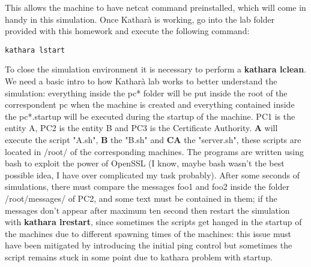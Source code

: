 \documentclass{article}
\begin{document}
This allows the machine to have netcat command preinstalled, which will come in handy in this simulation. Once Katharà is working, go into the lab folder provided with this homework and execute the following command:  

\begin{lstlisting}[breaklines]
kathara lstart
\end{lstlisting}

To close the simulation environment it is necessary to perform a \textbf{kathara lclean}. We need a basic intro to how Katharà lab works to better understand the simulation: everything inside the pc* folder will be put inside the root of the correspondent pc when the machine is created and everything contained inside the pc*.startup will be executed during the startup of the machine. PC1 is the entity A, PC2 is the entity B and PC3 is the Certificate Authority. \textbf{A} will execute the script "A.sh", \textbf{B} the "B.sh" and \textbf{CA} the "server.sh", these scripts are located in /root/ of the corresponding machines. The programs are written using bash to exploit the power of OpenSSL (I know, maybe bash wasn't the best possible idea, I have over complicated my task probably). After some seconds of simulations, there must compare the messages foo1 and foo2 inside the folder /root/messages/ of PC2, and some text must be contained in them; if the messages don't appear after maximum ten second then restart the simulation with \textbf{kathara lrestart}, since sometimes the scripts get hanged in the startup of the machines due to different spawning times of the machines: this issue must have been mitigated by introducing the initial ping control but sometimes the script remains stuck in some point due to kathara problem with startup.\newline
\end{document}
